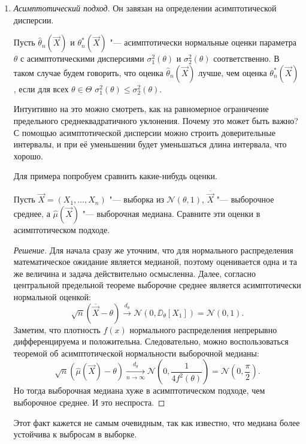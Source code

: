 \begin{enumerate}[resume]
	\item \emph{Асимптотический подход}. Он завязан на определении асимптотической дисперсии.
	\begin{definition}
		Пусть $\hat{\theta}_{n}(\vec{X})$ и $\theta^{*}_{n}(\vec{X})$ "--- асимптотически нормальные оценки параметра $\theta$ с асимптотическими дисперсиями $\sigma_{1}^{2}(\theta)$ и $\sigma_{2}^{2}(\theta)$ соответственно. В таком случае будем говорить, что оценка $\hat{\theta}_{n}(\vec{X})$ лучше, чем оценка $\theta^{*}_{n}(\vec{X})$, если для всех $\theta \in \Theta$ $\sigma_{1}^{2}(\theta) \leq \sigma_{2}^{2}(\theta)$.
	\end{definition}
	Интуитивно на это можно смотреть, как на равномерное ограничение предельного среднеквадратичного уклонения. Почему это может быть важно? С помощью асимптотической дисперсии можно строить доверительные интервалы, и при её уменьшении будет уменьшаться длина интервала, что хорошо.
	
	Для примера попробуем сравнить какие-нибудь оценки.
	\begin{problem}
		Пусть $\vec{X} = (X_{1}, \ldots, X_{n})$ "--- выборка из $\mathcal{N}(\theta, 1)$, $\overline{\vec{X}}$ "--- выборочное среднее, а $\hat{\mu}(\vec{X})$ "--- выборочная медиана. Сравните эти оценки в асимптотическом подходе.
	\end{problem}
	\begin{proof}[Решение]
		Для начала сразу же уточним, что для нормального распределения математическое ожидание является медианой, поэтому оценивается одна и та же величина и задача действительно осмысленна. Далее, согласно центральной предельной теореме выборочне среднее является асимптотически нормальной оценкой:
		\[
			\sqrt{n}(\overline{\vec{X}} - \theta) \xrightarrow{d_{\theta}} \mathcal{N}(0, \DD_{\theta}[X_{1}]) = \mathcal{N}(0, 1).
		\]
		Заметим, что плотность $f(x)$ нормального распределения непрерывно дифференцируема и положительна. Следовательно, можно воспользоваться теоремой об асимптотической нормальности выборочной медианы:
		\[
			\sqrt{n}(\hat{\mu}(\vec{X}) - \theta) \xrightarrow[n \to \infty]{d_{\theta}} \mathcal{N}\left(0, \frac{1}{4f^{2}(\theta)}\right) = \mathcal{N}\left(0, \frac{\pi}{2}\right).
		\]
		Но тогда выборочная медиана хуже в асимптотическом подходе, чем выборочное среднее. И это неспроста.
	\end{proof}
	Этот факт кажется не самым очевидным, так как известно, что медиана более устойчива к выбросам в выборке.
\end{enumerate}

